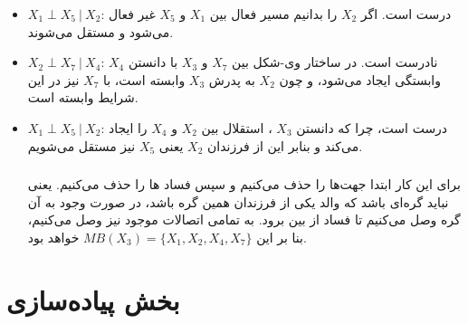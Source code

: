 \documentclass[11.5pt,a4paper]{article}
\begin{document}
\begin{itemize}
\item{$X_1 \perp X_5 \ | \ X_2 $}:
درست است. اگر 
$X_2$
را بدانیم مسیر فعال بین $X_1$ و $X_5$ غیر فعال می‌شود و مستقل می‌شوند.
\item{$X_2 \perp X_7 \ | \ X_4 $}:
نادرست است. در ساختار وی-شکل بین $X_7$ و $X_3$ با دانستن $X_4$ وابستگی ایجاد می‌شود، و چون $X_2$ به پدرش $X_3$ وابسته است، با $X_7$ نیز در این شرایط وابسته است. 

\item{$X_1 \perp X_5 \ | \ X_2 $}:
درست است، چرا که دانستن $X_3$ ، استقلال بین $X_2$ و $X_4$ را ایجاد می‌کند و بنابر این از فرزندان $X_2$ یعنی $X_5$ نیز مستقل می‌شویم. 

\subsubsection{  }
برای این کار ابتدا جهت‌ها را حذف می‌کنیم و سپس فساد ها را حذف می‌کنیم. یعنی نباید گره‌ای باشد که والد یکی از فرزندان همین گره باشد، در صورت وجود به آن گره وصل می‌کنیم تا فساد از بین برود. به تمامی اتصالات موجود نیز وصل می‌کنیم، بنا بر این
$MB(X_3) = \lbrace X_1 , X_2 , X_4 , X_7 \rbrace $
خواهد بود. 
\end{itemize}

\section{بخش پیاده‌سازی}
\end{document}
